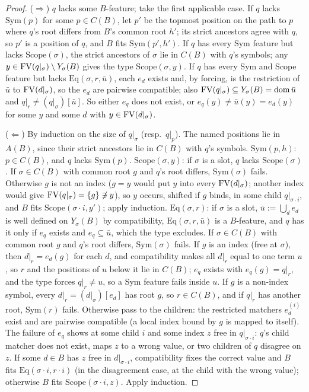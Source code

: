 \begin{proof}
($\Rightarrow$) $q$ lacks some $B$-feature; take the first applicable case. If $q$ lacks $\mathrm{Sym}(p)$ for some $p\in
C(B)$, let $p'$ be the topmost position on the path to $p$ where $q$'s root differs from $B$'s common root $h'$; its strict
ancestors agree with $q$, so $p'$ is a position of $q$, and $B$ fits $\mathrm{Sym}(p',h')$. If $q$ has every Sym feature but
lacks $\mathrm{Scope}(\sigma)$, the strict ancestors of $\sigma$ lie in $C(B)$ with $q$'s symbols; any $y\in\mathrm{FV}(q|_\sigma)
\setminus Y_\sigma(B)$ gives the type $\mathrm{Scope}(\sigma,y)$. If $q$ has every Sym and Scope feature but lacks
$\mathrm{Eq}(\sigma,r,\bar u)$, each $e_d$ exists and, by forcing, is the restriction of $\bar u$ to $\mathrm{FV}(d|_\sigma)$, so the
$e_d$ are pairwise compatible; also $\mathrm{FV}(q|_\sigma)\subseteq Y_\sigma(B)=\mathrm{dom}\,\bar u$ and $q|_r\neq(q|_\sigma)[\bar u]$. So
either $e_q$ does not exist, or $e_q(y)\neq\bar u(y)=e_d(y)$ for some $y$ and some $d$ with $y\in\mathrm{FV}(d|_\sigma)$.

($\Leftarrow$) By induction on the size of $q|_\sigma$ (resp.\ $q|_p$). The named positions lie in $A(B)$, since their
strict ancestors lie in $C(B)$ with $q$'s symbols. \emph{$\mathrm{Sym}(p,h)$}: $p\in C(B)$, and $q$ lacks $\mathrm{Sym}(p)$.
\emph{$\mathrm{Scope}(\sigma,y)$}: if $\sigma$ is a slot, $q$ lacks $\mathrm{Scope}(\sigma)$. If $\sigma\in C(B)$ with common
root $g$ and $q$'s root differs, $\mathrm{Sym}(\sigma)$ fails. Otherwise $g$ is not an index ($g=y$ would put $y$ into every
$\mathrm{FV}(d|_\sigma)$; another index would give $\mathrm{FV}(q|_\sigma)=\{g\}\not\ni y$), so $y$ occurs, shifted if $g$ binds, in some child
$q|_{\sigma\cdot i}$, and $B$ fits $\mathrm{Scope}(\sigma\cdot i,y')$; apply induction. \emph{$\mathrm{Eq}(\sigma,r)$}: if
$\sigma$ is a slot, $\bar u:=\bigcup_de_d$ is well defined on $Y_\sigma(B)$ by compatibility, $\mathrm{Eq}(\sigma,r,\bar u)$ is a
$B$-feature, and $q$ has it only if $e_q$ exists and $e_q\subseteq\bar u$, which the type excludes. If $\sigma\in C(B)$ with
common root $g$ and $q$'s root differs, $\mathrm{Sym}(\sigma)$ fails. If $g$ is an index (free at $\sigma$), then
$d|_r=e_d(g)$ for each $d$, and compatibility makes all $d|_r$ equal to one term $u$, so $r$ and the positions of $u$ below it
lie in $C(B)$; $e_q$ exists with $e_q(g)=q|_r$, and the type forces $q|_r\neq u$, so a Sym feature fails inside $u$. If $g$
is a non-index symbol, every $d|_r=(d|_\sigma)[e_d]$ has root $g$, so $r\in C(B)$, and if $q|_r$ has another root,
$\mathrm{Sym}(r)$ fails. Otherwise pass to the children: the restricted matchers $e^{(i)}_d$ exist and are pairwise
compatible (a local index bound by $g$ is mapped to itself). The failure of $e_q$ shows at some child $i$ and some index
$z$ free in $q|_{\sigma\cdot i}$: $q$'s child matcher does not exist, maps $z$ to a wrong value, or two children of $q$
disagree on $z$. If some $d\in B$ has $z$ free in $d|_{\sigma\cdot i}$, compatibility fixes the correct value and $B$ fits
$\mathrm{Eq}(\sigma\cdot i,r\cdot i)$ (in the disagreement case, at the child with the wrong value); otherwise $B$ fits
$\mathrm{Scope}(\sigma\cdot i,z)$. Apply induction.


\end{proof}
